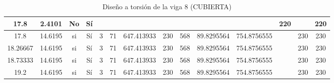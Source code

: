 \begin{table}[H]
{\begin{tabular}{|c|c|c|c|c|c|c|c|c|c|c|c|c|c|}
\hline
17.8 & 2.4101 & No  & Sí  &     &     &     &     &     &     &     & 220 &     & 220 \bigstrut\\
\hline
17.8 & 14.6195 & si  & Sí  & 3   & 71  & 647.413933 & 230 & 568 & 89.8295564 & 754.8756555 &     & 230 & 230 \bigstrut\\
\hline
18.26667 & 14.6195 & si  & Sí  & 3   & 71  & 647.413933 & 230 & 568 & 89.8295564 & 754.8756555 &     & 230 & 230 \bigstrut\\
\hline
18.73333 & 14.6195 & si  & Sí  & 3   & 71  & 647.413933 & 230 & 568 & 89.8295564 & 754.8756555 &     & 230 & 230 \bigstrut\\
\hline
19.2 & 14.6195 & si  & Sí  & 3   & 71  & 647.413933 & 230 & 568 & 89.8295564 & 754.8756555 &     & 230 & 230 \bigstrut\\
\hline
\end{tabular}%

  



  }
      \caption{Diseño a torsión de la viga 8 (CUBIERTA) }
  \label{tab:T VG8 CUB }%
\end{table}%